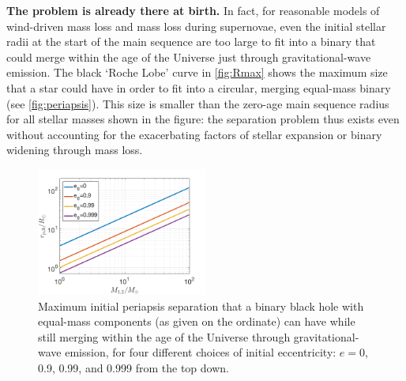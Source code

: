 \documentclass[iop,onecolumn]{revtex4}
\begin{document}
\textbf{The problem is already there at birth.} In fact, for reasonable models of wind-driven mass loss and mass loss during supernovae, even the initial stellar radii at the start of the main sequence are too large to fit into a binary that could merge within the age of the Universe just through gravitational-wave emission.  The black `Roche Lobe' curve in \autoref{fig:Rmax} shows the maximum size that a star could have in order to fit into a circular, merging equal-mass binary (see \autoref{fig:periapsis}).  This size is smaller than the zero-age main sequence radius for all stellar masses shown in the figure: the separation problem thus exists even without accounting for the exacerbating factors of stellar expansion or binary widening through mass loss.
 
 


\begin{figure}
	\centering
	\includegraphics[width=0.5\textwidth]{M-rp-log.png}
	\caption{Maximum initial periapsis separation that a binary black hole with equal-mass components (as given on the ordinate) can have while still merging within the age of the Universe through gravitational-wave emission, for four different choices of initial eccentricity: $e=0$, 0.9, 0.99, and 0.999 from the top down.\label{fig:periapsis}}
\end{figure}
	
\end{document}
